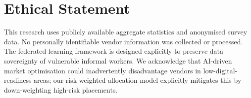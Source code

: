 \documentclass{article}
\begin{document}
\section*{Ethical Statement}

This research uses publicly available aggregate statistics and anonymised survey data.
No personally identifiable vendor information was collected or processed.
The federated learning framework is designed explicitly to preserve data sovereignty of vulnerable informal workers.
We acknowledge that AI-driven market optimisation could inadvertently disadvantage vendors in low-digital-readiness areas; our risk-weighted allocation model explicitly mitigates this by down-weighting high-risk placements.



\end{document}
